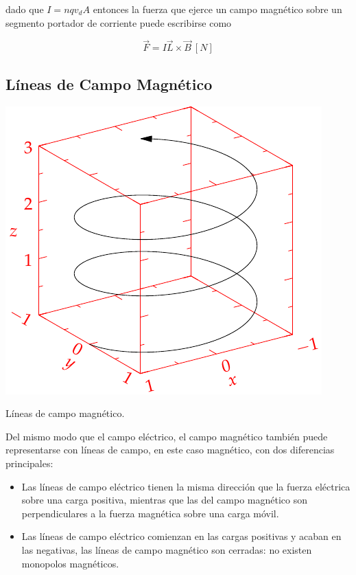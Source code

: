 \documentclass{tufte-handout}
\begin{document}
dado que $I = nqv_dA$ entonces la fuerza que ejerce un campo magnético sobre un segmento portador de corriente puede escribirse como

\begin{equation}
\vec{F} = I\vec{L}\times\vec{B}~[N]
\end{equation}

\subsection{Líneas de Campo Magnético}

\begin{marginfigure}%
    \includegraphics[width=\linewidth]{helix}
    \caption{Líneas de campo magnético.}
    \label{fig:lineascampomagnetico}
\end{marginfigure}

Del mismo modo que el campo eléctrico, el campo magnético también puede representarse con líneas de campo, en este caso magnético, con dos diferencias principales:

\begin{itemize}
    \item Las líneas de campo eléctrico tienen la misma dirección que la fuerza eléctrica sobre una carga positiva, mientras que las del campo magnético son perpendiculares a la fuerza magnética sobre una carga móvil.
    \item Las líneas de campo eléctrico comienzan en las cargas positivas y acaban en las negativas, las líneas de campo magnético son cerradas: no existen monopolos magnéticos.
\end{itemize}
\end{document}
